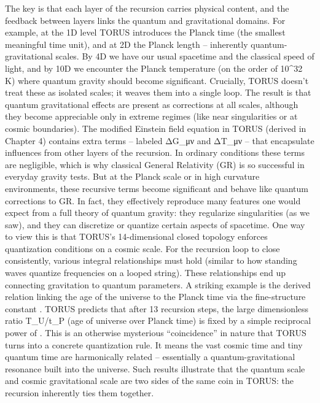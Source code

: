 \documentclass[]{article}
\begin{document}
The key is that each layer of the recursion carries physical content,
and the feedback between layers links the quantum and gravitational
domains. For example, at the 1D level TORUS introduces the Planck time
(the smallest meaningful time unit), and at 2D the Planck length --
inherently quantum-gravitational scales. By 4D we have our usual
spacetime and the classical speed of light, and by 10D we encounter the
Planck temperature (on the order of 10\^{}32 K) where quantum gravity
should become significant. Crucially, TORUS doesn't treat these as
isolated scales; it weaves them into a single loop. The result is that
quantum gravitational effects are present as corrections at all scales,
although they become appreciable only in extreme regimes (like near
singularities or at cosmic boundaries). The modified Einstein field
equation in TORUS (derived in Chapter 4) contains extra terms -- labeled
ΔG\_μν and ΔT\_μν -- that encapsulate influences from other layers of
the recursion. In ordinary conditions these terms are negligible, which
is why classical General Relativity (GR) is so successful in everyday
gravity tests. But at the Planck scale or in high curvature
environments, these recursive terms become significant and behave like
quantum corrections to GR. In fact, they effectively reproduce many
features one would expect from a full theory of quantum gravity: they
regularize singularities (as we saw), and they can discretize or
quantize certain aspects of spacetime. One way to view this is that
TORUS's 14-dimensional closed topology enforces quantization conditions
on a cosmic scale. For the recursion loop to close consistently, various
integral relationships must hold (similar to how standing waves quantize
frequencies on a looped string). These relationships end up connecting
gravitation to quantum parameters. A striking example is the derived
relation linking the age of the universe to the Planck time via the
fine-structure constant \alpha. TORUS predicts that after 13 recursion steps,
the large dimensionless ratio T\_U/t\_P (age of universe over Planck
time) is fixed by a simple reciprocal power of \alpha. This is an otherwise
mysterious ``coincidence'' in nature that TORUS turns into a concrete
quantization rule. It means the vast cosmic time and tiny quantum time
are harmonically related -- essentially a quantum-gravitational
resonance built into the universe. Such results illustrate that the
quantum scale and cosmic gravitational scale are two sides of the same
coin in TORUS: the recursion inherently ties them together.
\end{document}
